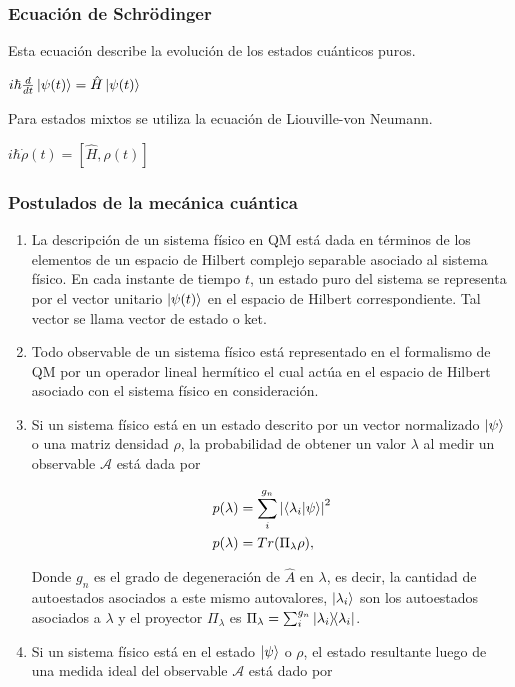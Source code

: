 \documentclass[xetex,mathserif,serif]{beamer}
\begin{document}
\begin{frame}
    \frametitle{Ecuación de Schrödinger}

Esta ecuación describe la evolución de los estados cuánticos puros.

$i \hbar \frac{d}{dt} \ket{\psi(t)} = \hat{H} \ket{\psi(t)}$

Para estados mixtos se utiliza la ecuación de Liouville-von Neumann.

$i \hbar \dot{\rho}(t) = [\hat{H}, \rho(t)]$

\end{frame}

\begin{frame}
    \frametitle{Postulados de la mecánica cuántica}

\begin{enumerate}
    \item La descripción de un sistema físico en QM está dada en términos de los elementos de un espacio de Hilbert complejo separable asociado al sistema físico. En cada instante de tiempo $t$, un estado puro del sistema se representa por el vector unitario $\ket{\psi(t)}$ en el espacio de Hilbert correspondiente. Tal vector se llama vector de estado o ket.
    \item Todo observable de un sistema físico está representado en el formalismo de QM por un operador lineal hermítico el cual actúa en el espacio de Hilbert asociado con el sistema físico en consideración.
    \item Si un sistema físico está en un estado descrito por un vector normalizado $\ket{\psi}$ o una matriz densidad $\rho$, la probabilidad de obtener un valor $\lambda$ al medir un observable $\mathcal{A}$ está dada por 
        
        \begin{align}
            p(\lambda) &= \sum\limits_i^{g_n} \abs{\braket{\lambda_i}{\psi}}^2 \\
            p(\lambda) &= Tr(\Pi_\lambda \rho) ,
        \end{align}

        Donde $g_n$ es el grado de degeneración de $\hat{A}$ en $\lambda$, es decir, la cantidad de autoestados asociados a este mismo autovalores, $\ket{\lambda_i}$ son los autoestados asociados a $\lambda$ y el proyector $\Pi_\lambda$ es $\Pi_\lambda = \sum_i^{g_n} \ketbra{\lambda_i}$.

    \item Si un sistema físico está en el estado $\ket{\psi}$ o $\rho$, el estado resultante luego de una medida ideal del observable $\mathcal{A}$ está dado por


\end{enumerate}
\end{frame}
\end{document}
